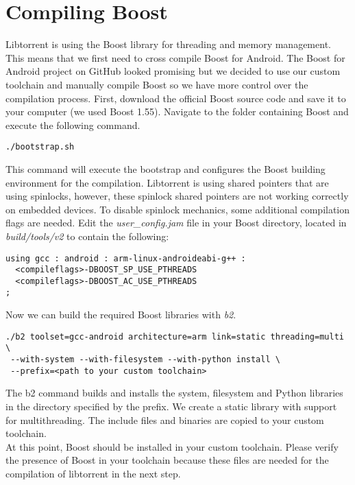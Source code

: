 \section{Compiling Boost}
	Libtorrent is using the Boost library for threading and memory management. This means that we first need to cross compile Boost for Android. The Boost for Android project on GitHub looked promising but we decided to use our custom toolchain and manually compile Boost so we have more control over the compilation process. First, download the official Boost source code and save it to your computer (we used Boost 1.55). Navigate to the folder containing Boost and execute the following command.
	\begin{lstlisting}
./bootstrap.sh
	\end{lstlisting}
	This command will execute the bootstrap and configures the Boost building environment for the compilation. Libtorrent is using shared pointers that are using spinlocks, however, these spinlock shared pointers are not working correctly on embedded devices. To disable spinlock mechanics, some additional compilation flags are needed. Edit the \emph{user\_config.jam} file in your Boost directory, located in \emph{build/tools/v2} to contain the following:
	\begin{lstlisting}
using gcc : android : arm-linux-androideabi-g++ : 
  <compileflags>-DBOOST_SP_USE_PTHREADS 
  <compileflags>-DBOOST_AC_USE_PTHREADS
;
	\end{lstlisting}
	Now we can build the required Boost libraries with \emph{b2}.
	\begin{lstlisting}
./b2 toolset=gcc-android architecture=arm link=static threading=multi \
 --with-system --with-filesystem --with-python install \
 --prefix=<path to your custom toolchain>
	\end{lstlisting}
	The b2 command builds and installs the system, filesystem and Python libraries in the directory specified by the prefix. We create a static library with support for multithreading. The include files and binaries are copied to your custom toolchain.\\
	At this point, Boost should be installed in your custom toolchain. Please verify the presence of Boost in your toolchain because these files are needed for the compilation of libtorrent in the next step.